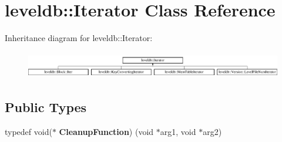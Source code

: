 \hypertarget{classleveldb_1_1_iterator}{}\section{leveldb\+:\+:Iterator Class Reference}
\label{classleveldb_1_1_iterator}
Inheritance diagram for leveldb\+:\+:Iterator\+:\begin{figure}[H]
\begin{center}
\leavevmode
\includegraphics[height=1.196581cm]{classleveldb_1_1_iterator}
\end{center}
\end{figure}
\subsection*{Public Types}
\begin{DoxyCompactItemize}
\item 
\mbox{\label{classleveldb_1_1_iterator_ae40c9eedd82a722d24fde1fd8bee4afa}} 
typedef void($\ast$ {\bfseries Cleanup\+Function}) (void $\ast$arg1, void $\ast$arg2)
\end{DoxyCompactItemize}
